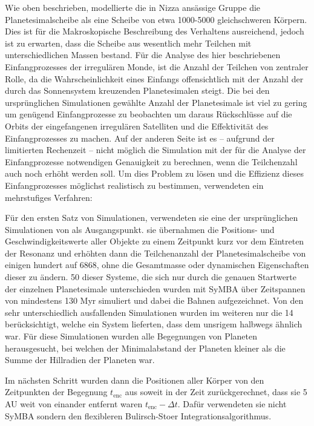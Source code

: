 \documentclass[12pt,a4paper,twoside]{article}
\begin{document}
Wie oben beschrieben, modellierte die in Nizza ansässige Gruppe die Planetesimalscheibe als eine Scheibe von etwa 1000-5000 gleichschweren Körpern. Dies ist für die Makroskopische Beschreibung des Verhaltens ausreichend, jedoch ist zu erwarten, dass die Scheibe aus wesentlich mehr Teilchen mit unterschiedlichen Massen bestand.
Für die Analyse des hier beschriebenen Einfangprozesses der irregulären Monde, ist die Anzahl der Teilchen von zentraler Rolle, da die Wahrscheinlichkeit eines Einfangs offensichtlich mit der Anzahl der durch das Sonnensystem kreuzenden Planetesimalen steigt.
Die bei den ursprünglichen Simulationen gewählte Anzahl der Planetesimale ist viel zu gering um genügend Einfangprozesse zu beobachten um daraus Rückschlüsse auf die Orbits der eingefangenen irregulären Satelliten und die Effektivität des Einfangprozesses zu machen.
Auf der anderen Seite ist es -- aufgrund der limitierten Rechenzeit -- nicht möglich die Simulation mit der für die Analyse der Einfangprozesse notwendigen Genauigkeit zu berechnen, wenn die Teilchenzahl auch noch erhöht werden soll.
Um dies Problem zu lösen und die Effizienz dieses Einfangprozesses möglichst realistisch zu bestimmen, verwendeten \cite{Nesvorny2007} ein mehrstufiges Verfahren:

Für den ersten Satz von Simulationen, verwendeten sie eine der ursprünglichen Simulationen von \cite{Gomes2005} als Ausgangspunkt.
sie übernahmen die Positions- und Geschwindigkeitswerte aller Objekte zu einem Zeitpunkt kurz vor dem Eintreten der Resonanz und erhöhten dann die Teilchenanzahl der Planetesimalscheibe von einigen hundert auf 6868, %
ohne die Gesamtmasse oder dynamischen Eigenschaften dieser zu ändern. 50 dieser Systeme, die sich nur durch die genauen Startwerte der einzelnen Planetesimale unterschieden wurden mit SyMBA über Zeitspannen von mindestens 130 Myr simuliert und dabei die Bahnen aufgezeichnet.
Von den sehr unterschiedlich ausfallenden Simulationen wurden im weiteren nur die 14 berücksichtigt, welche ein System lieferten, dass dem unsrigem halbwegs ähnlich war\cite{Nesvorny2007}. %
Für diese Simulationen wurden alle Begegnungen von Planeten herausgesucht, bei welchen der Minimalabstand der Planeten kleiner als die Summe der Hillradien der Planeten war. %

Im nächsten Schritt wurden dann die Positionen aller Körper von den Zeitpunkten der Begegnung $t_{\mathrm{enc}}$ aus soweit in der Zeit zurückgerechnet, dass sie 5 AU weit von einander entfernt waren  $t_{\mathrm{enc}} - \Delta t$\cite{Nesvorny2007}.
Dafür verwendeten sie nicht SyMBA sondern den flexibleren Bulirsch-Stoer Integrationsalgorithmus. %
\end{document}
